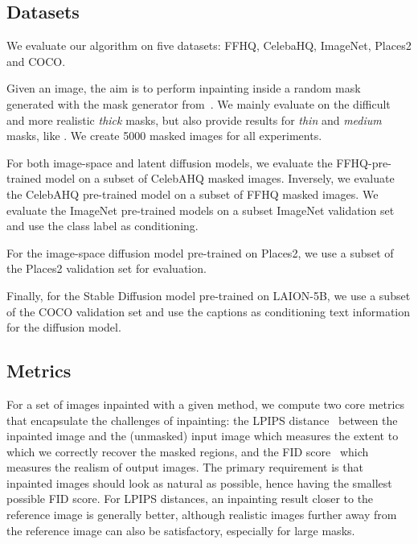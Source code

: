 \subsection{Datasets}
We evaluate our algorithm on five datasets: FFHQ, CelebaHQ, ImageNet, Places2 and COCO.

Given an image, the aim is to perform inpainting inside a random mask generated with the mask generator from~\cite{lama}. 
We mainly evaluate on the difficult and more realistic \textit{thick} masks, but also provide results for \textit{thin} and 
\textit{medium} masks, like \cite{lama}. We create 5000 masked images for all experiments.

For both image-space and latent diffusion models, we evaluate the FFHQ-pre-trained model on a subset of CelebAHQ masked images. 
Inversely, we evaluate the CelebAHQ pre-trained model on a subset of FFHQ masked images. We evaluate the ImageNet pre-trained 
models on a subset ImageNet validation set and use the class label as conditioning. 

For the image-space diffusion model pre-trained on Places2, we use a subset of the Places2 validation set for evaluation.

Finally, for the Stable Diffusion model pre-trained on LAION-5B, we use a subset of the COCO validation set and use the 
captions as conditioning text information for the diffusion model. 

\subsection{Metrics}

For a set of images inpainted with a given method, we compute two core metrics that encapsulate the challenges
 of inpainting: the LPIPS distance~\citep{zhanglpips2018} between the inpainted image and the (unmasked) input image which measures 
 the extent to which we correctly recover the masked regions, and the FID score~\citep{heusel2017gans} which measures the realism 
 of output images. The primary requirement is that inpainted images should look as natural as possible, hence having the smallest 
 possible FID score. For LPIPS distances, an inpainting result closer to the reference image is generally better, although realistic 
 images further away from the reference image can also be satisfactory, especially for large masks. 



